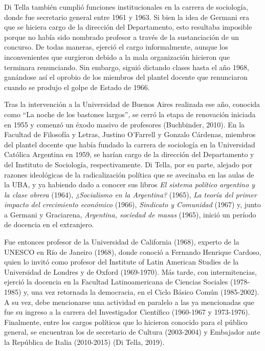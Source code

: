 Di Tella también cumplió funciones institucionales en la carrera de sociología, donde fue secretario general entre 1961 y 1963. Si bien la idea de Germani era que se hiciera cargo de la dirección del Departamento, esto resultaba imposible porque no había sido nombrado profesor a través de la sustanciación de un concurso. De todas maneras, ejerció el cargo informalmente, aunque los inconvenientes que surgieron debido a la mala organización hicieron que terminara renunciando. Sin embargo, siguió dictando clases hasta el año 1968, ganándose así el oprobio de los miembros del plantel docente que renunciaron cuando se produjo el golpe de Estado de 1966.

Tras la intervención a la Universidad de Buenos Aires realizada ese año, conocida como ``La noche de los bastones largos'', se cerró la etapa de renovación iniciada en 1955 y comenzó un éxodo masivo de profesores (Buchbinder, 2010). En la Facultad de Filosofía y Letras, Justino O'Farrell y Gonzalo Cárdenas, miembros del plantel docente que había fundado la carrera de sociología en la Universidad Católica Argentina en 1959, se harían cargo de la dirección del Departamento y del Instituto de Sociología, respectivamente. Di Tella, por su parte, alejado por razones ideológicas de la radicalización política que se avecinaba en las aulas de la UBA, y ya habiendo dado a conocer sus libros \emph{El sistema político argentino y la clase obrera} (1964), \emph{¿Socialismo en la Argentina?} (1965), \emph{La teoría del primer impacto del crecimiento económico} (1966), \emph{Sindicato y Comunidad} (1967) y, junto a Germani y Graciarena, \emph{Argentina, sociedad de masas} (1965), inició un período de docencia en el extranjero.

Fue entonces profesor de la Universidad de California (1968), experto de la UNESCO en Río de Janeiro (1968), donde conoció a Fernando Henrique Cardoso, quien lo invitó como profesor del Institute of Latin American Studies de la Universidad de Londres y de Oxford (1969-1970). Más tarde, con intermitencias, ejerció la docencia en la Facultad Latinoamericana de Ciencias Sociales (1978-1985) y, una vez retornada la democracia, en el Ciclo Básico Común (1985-2002). A su vez, debe mencionarse una actividad en paralelo a las ya mencionadas que fue su ingreso a la carrera del Investigador Científico (1960-1967 y 1973-1976). Finalmente, entre los cargos políticos que lo hicieron conocido para el público general, se encuentran los de secretario de Cultura (2003-2004) y Embajador ante la República de Italia (2010-2015) (Di Tella, 2019).

